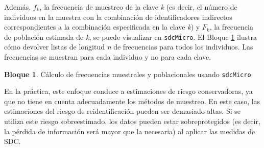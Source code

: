 \documentclass[
]{book}
\newenvironment{Shaded}{\begin{snugshade}}{\end{snugshade}}
\newcommand{\AttributeTok}[1]{\textcolor[rgb]{0.77,0.63,0.00}{#1}}
\newcommand{\CommentTok}[1]{\textcolor[rgb]{0.56,0.35,0.01}{\textit{#1}}}
\newcommand{\FunctionTok}[1]{\textcolor[rgb]{0.00,0.00,0.00}{#1}}
\newcommand{\NormalTok}[1]{#1}
\newcommand{\OtherTok}[1]{\textcolor[rgb]{0.56,0.35,0.01}{#1}}
\newcommand{\SpecialCharTok}[1]{\textcolor[rgb]{0.00,0.00,0.00}{#1}}
\newcommand{\StringTok}[1]{\textcolor[rgb]{0.31,0.60,0.02}{#1}}
\theoremstyle{definition}
\theoremstyle{definition}
\newtheorem{example}{Bloque}[chapter]
\theoremstyle{definition}
\theoremstyle{definition}
\theoremstyle{remark}
\begin{document}
Además, \(f_{k}\), la frecuencia de muestreo de la clave \emph{k} (es decir, el número de individuos en la muestra con la combinación de identificadores indirectos correspondientes a la combinación especificada en la clave \emph{k}) y \(F_{k}\), la frecuencia de población estimada de \emph{k}, se puede visualizar en \texttt{sdcMicro}. El Bloque \ref{exm:bloqueMR2} ilustra cómo devolver listas de longitud \emph{n} de frecuencias para todos los individuos. Las frecuencias se muestran para cada individuo y no para cada clave.

\begin{example}
\protect\hypertarget{exm:bloqueMR2}{}\label{exm:bloqueMR2}Cálculo de frecuencias muestrales y poblacionales usando \texttt{sdcMicro}
\end{example}

\begin{Shaded}
\end{Shaded}

En la práctica, este enfoque conduce a estimaciones de riesgo conservadoras, ya que no tiene en cuenta adecuadamente los métodos de muestreo. En este caso, las estimaciones del riesgo de reidentificación pueden ser demasiado altas. Si se utiliza este riesgo sobreestimado, los datos pueden estar sobreprotegidos (es decir, la pérdida de información será mayor que la necesaria) al aplicar las medidas de SDC.
\end{document}
